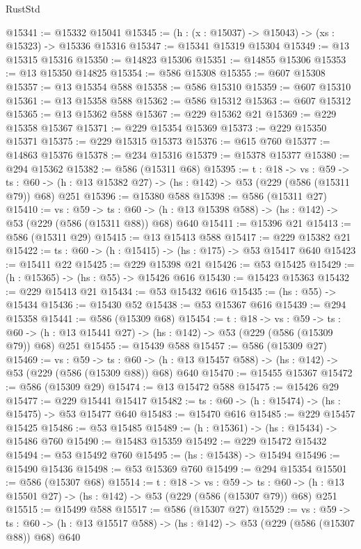 \begin{lexlean}{RustStd}
\begin{coremodule}
@15341 := @15332 @15041
@15345 := (h : (x : @15037) -> @15043) -> (xs : @15323) -> @15336 @15316
@15347 := @15341 @15319 @15304
@15349 := @13 @15315 @15316
@15350 := @14823 @15306
@15351 := @14855 @15306
@15353 := @13 @15350 @14825
@15354 := @586 @15308
@15355 := @607 @15308
@15357 := @13 @15354 @588
@15358 := @586 @15310
@15359 := @607 @15310
@15361 := @13 @15358 @588
@15362 := @586 @15312
@15363 := @607 @15312
@15365 := @13 @15362 @588
@15367 := @229 @15362 @21
@15369 := @229 @15358 @15367
@15371 := @229 @15354 @15369
@15373 := @229 @15350 @15371
@15375 := @229 @15315 @15373
@15376 := @615 @760
@15377 := @14863 @15376
@15378 := @234 @15316
@15379 := @15378 @15377
@15380 := @294 @15362
@15382 := @586 (@15311 @68)
@15395 := {t : @18} ->
  {vs : @59} ->
  {ts : @60} -> (h : @13 @15382 @27) -> (hs : @142) -> @53 (@229 (@586 (@15311 @79)) @68) @251
@15396 := @15380 @588
@15398 := @586 (@15311 @27)
@15410 := {vs : @59} ->
  {ts : @60} -> (h : @13 @15398 @588) -> (hs : @142) -> @53 (@229 (@586 (@15311 @88)) @68) @640
@15411 := @15396 @21
@15413 := @586 (@15311 @29)
@15415 := @13 @15413 @588
@15417 := @229 @15382 @21
@15422 := {ts : @60} -> (h : @15415) -> (hs : @175) -> @53 @15417 @640
@15423 := @15411 @22
@15425 := @229 @15398 @21
@15426 := @53 @15425
@15429 := (h : @15365) -> (hs : @55) -> @15426 @616
@15430 := @15423 @15363
@15432 := @229 @15413 @21
@15434 := @53 @15432 @616
@15435 := (hs : @55) -> @15434
@15436 := @15430 @52
@15438 := @53 @15367 @616
@15439 := @294 @15358
@15441 := @586 (@15309 @68)
@15454 := {t : @18} ->
  {vs : @59} ->
  {ts : @60} -> (h : @13 @15441 @27) -> (hs : @142) -> @53 (@229 (@586 (@15309 @79)) @68) @251
@15455 := @15439 @588
@15457 := @586 (@15309 @27)
@15469 := {vs : @59} ->
  {ts : @60} -> (h : @13 @15457 @588) -> (hs : @142) -> @53 (@229 (@586 (@15309 @88)) @68) @640
@15470 := @15455 @15367
@15472 := @586 (@15309 @29)
@15474 := @13 @15472 @588
@15475 := @15426 @29
@15477 := @229 @15441 @15417
@15482 := {ts : @60} -> (h : @15474) -> (hs : @15475) -> @53 @15477 @640
@15483 := @15470 @616
@15485 := @229 @15457 @15425
@15486 := @53 @15485
@15489 := (h : @15361) -> (hs : @15434) -> @15486 @760
@15490 := @15483 @15359
@15492 := @229 @15472 @15432
@15494 := @53 @15492 @760
@15495 := (hs : @15438) -> @15494
@15496 := @15490 @15436
@15498 := @53 @15369 @760
@15499 := @294 @15354
@15501 := @586 (@15307 @68)
@15514 := {t : @18} ->
  {vs : @59} ->
  {ts : @60} -> (h : @13 @15501 @27) -> (hs : @142) -> @53 (@229 (@586 (@15307 @79)) @68) @251
@15515 := @15499 @588
@15517 := @586 (@15307 @27)
@15529 := {vs : @59} ->
  {ts : @60} -> (h : @13 @15517 @588) -> (hs : @142) -> @53 (@229 (@586 (@15307 @88)) @68) @640

\end{coremodule}
\end{lexlean}
